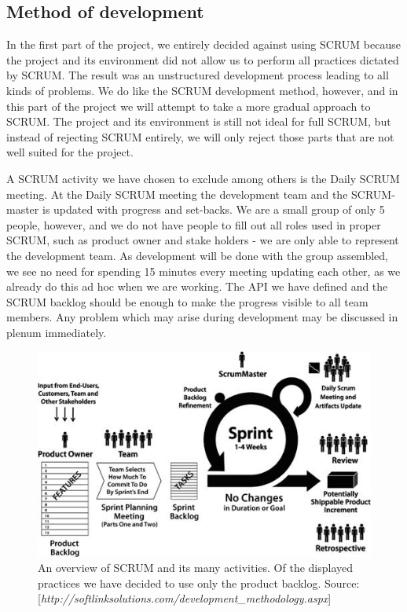 \subsection{Method of development}
In the first part of the project, we entirely decided against using SCRUM because the project and its environment did not allow us to perform all practices dictated by SCRUM. The result was an unstructured development process leading to all kinds of problems.
We do like the SCRUM development method, however, and in this part of the project we will attempt to take a more gradual approach to SCRUM. The project and its environment is still not ideal for full SCRUM, but instead of rejecting SCRUM entirely, we will only reject those parts that are not well suited for the project.

A SCRUM activity we have chosen to exclude among others is the Daily SCRUM meeting.
At the Daily SCRUM meeting the development team and the SCRUM-master is updated with progress and set-backs.
We are a small group of only 5 people, however, and we do not have people to fill out all roles used in proper SCRUM, such as product owner and stake holders - we are only able to represent the development team.
As development will be done with the group assembled, we see no need for spending 15 minutes every meeting updating each other, as we already do this ad hoc when we are working.
The API we have defined and the SCRUM backlog should be enough to make the progress visible to all team members. Any problem which may arise during development may be discussed in plenum immediately.

\begin{figure}[t]
  \includegraphics[width=\textwidth]{illustrations/scrum.jpg}
  \caption{An overview of SCRUM and its many activities. Of the displayed practices we have decided to use only the product backlog. Source: [\textit{http://softlinksolutions.com/development\_methodology.aspx}]}
  \label{scrum_picture}
\end{figure}


